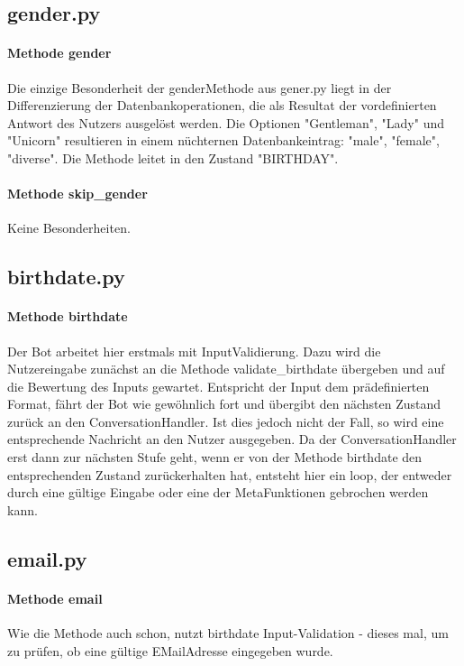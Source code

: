         \subsection{gender.py}
            \paragraph{Methode gender}
                Die einzige Besonderheit der gender\-Methode aus gener.py liegt in der Differenzierung der Datenbankoperationen, die als Resultat der vordefinierten Antwort des Nutzers ausgelöst werden. Die Optionen "Gentleman", "Lady" und "Unicorn" resultieren in einem nüchternen Datenbankeintrag: "male", "female", "diverse". Die Methode leitet in den Zustand "BIRTHDAY".
            
            \paragraph{Methode skip\_gender}
                Keine Besonderheiten. 
        

        \subsection{birthdate.py}
            \paragraph{Methode birthdate}
                Der Bot arbeitet hier erstmals mit Input\-Validierung. Dazu wird die Nutzereingabe zunächst an die Methode validate\_birthdate übergeben und auf die Bewertung des Inputs gewartet. Entspricht der Input dem prädefinierten Format, fährt der Bot wie gewöhnlich fort und übergibt den nächsten Zustand zurück an den ConversationHandler. Ist dies jedoch nicht der Fall, so wird eine entsprechende Nachricht an den Nutzer ausgegeben. Da der ConversationHandler erst dann zur nächsten Stufe geht, wenn er von der Methode birthdate den entsprechenden Zustand zurückerhalten hat, entsteht hier ein loop, der entweder durch eine gültige Eingabe oder eine der Meta\-Funktionen gebrochen werden kann.
        
        
        \subsection{email.py}
            \paragraph{Methode email}
                Wie die Methode auch schon, nutzt birthdate Input-Validation - dieses mal, um zu prüfen, ob eine gültige E\-Mail\-Adresse eingegeben wurde. 

